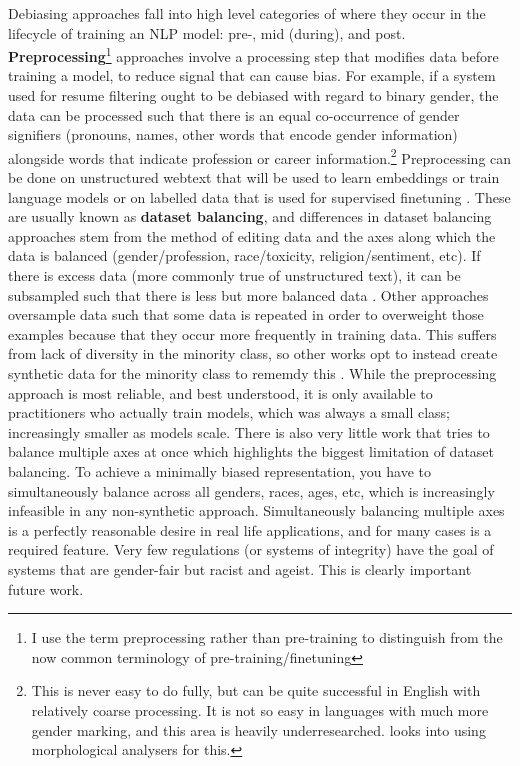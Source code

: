 Debiasing approaches fall into high level categories of where they occur in the lifecycle of training an NLP model: pre-, mid (during), and post. \textbf{Preprocessing}\footnote{I use the term preprocessing rather than pre-training to distinguish from the now common terminology of pre-training/finetuning} approaches involve a processing step that modifies data before training a model, to reduce signal that can cause bias. For example, if a system used for resume filtering ought to be debiased with regard to binary gender, the data can be processed such that there is an equal co-occurrence of gender signifiers (pronouns, names, other words that encode gender information) alongside words that indicate profession or career information.\footnote{This is never easy to do fully, but can be quite successful in English with relatively coarse processing. It is not so easy in languages with much more gender marking, and this area is heavily underresearched. \citet{gonen-etal-2019-grammatical} looks into using morphological analysers for this.}
Preprocessing can be done on unstructured webtext that will be used to learn embeddings or train language models \citep{} or on labelled data that is used for supervised finetuning \citep{}. These are usually known as \textbf{dataset balancing}, and differences in dataset balancing approaches stem from the method of editing data and the axes along which the data is balanced (gender/profession, race/toxicity, religion/sentiment, etc). If there is excess data (more commonly true of unstructured text), it can be subsampled such that there is less but more balanced data \citep{}. Other approaches oversample data such that some data is repeated \citep{} in order to overweight those examples because that they occur more frequently in training data. This suffers from lack of diversity in the minority class, so other works opt to instead create synthetic data for the minority class to rememdy this \citep{Dixon2018MeasuringAM}. While the preprocessing approach is most reliable, and best understood, it is only available to practitioners who actually train models, which was always a small class; increasingly smaller as models scale. There is also very little work that tries to balance multiple axes at once  which highlights the biggest limitation of dataset balancing. To achieve a minimally biased representation, you have to simultaneously balance across all genders, races, ages, etc, which is increasingly infeasible in any non-synthetic approach. 
Simultaneously balancing multiple axes is a perfectly reasonable desire in real life applications, and for many cases is a required feature. Very few regulations (or systems of integrity) have the goal of systems that are gender-fair but racist and ageist. This is clearly important future work.

